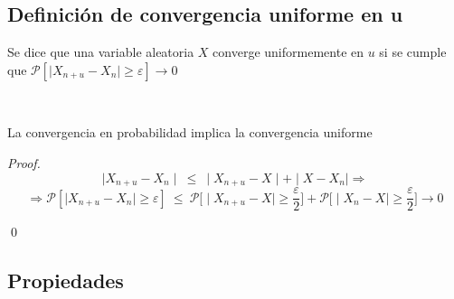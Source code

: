 \subsection{Definición de convergencia uniforme en u}

Se dice que una variable aleatoria $X$ converge uniformemente en $u$ si se cumple que $\mathcal{P}[\mid X_{n+u} - X_n \mid \geq \varepsilon] \to 0$

\begin{lemma}
\

La convergencia en probabilidad implica la convergencia uniforme
\end{lemma}

\begin{proof}
$$ \mid X_{n+u} - X_n \mid \ \leq \ \mid X_{n+u} - X \mid + \mid X - X_n \mid \Rightarrow$$
$$ \Rightarrow \mathcal{P}[\mid X_{n+u} - X_n \mid \geq \varepsilon] \ \leq \ \mathcal{P}\Big[\mid X_{n+u} - X \mid \geq \frac{\varepsilon}{2}\Big] + \mathcal{P}\Big[\mid X_{n} - X \mid \geq \frac{\varepsilon}{2}\Big] \to 0$$

\qed
\end{proof}

\subsection{Propiedades}


